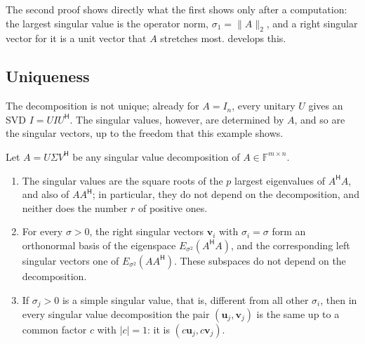 The second proof shows directly what the first shows only after a computation: the largest singular value is the operator norm, $\sigma_1=\|A\|_2$, and a right singular vector for it is a unit vector that $A$ stretches most.  develops this.

\subsection{Uniqueness}

The decomposition is not unique; already for $A=I_n$, every unitary $U$ gives an SVD $I=UIU^{\mathsf H}$. The singular values, however, are determined by $A$, and so are the singular vectors, up to the freedom that this example shows.

\begin{proposition}[Uniqueness]
\label{prop:svd-unique}
Let $A=U\Sigma V^{\mathsf H}$ be any singular value decomposition of $A\in\mathbb F^{m\times n}$.
\begin{enumerate}
\item The singular values are the square roots of the $p$ largest eigenvalues of $A^{\mathsf H}A$, and also of $AA^{\mathsf H}$; in particular, they do not depend on the decomposition, and neither does the number $r$ of positive ones.
\item For every $\sigma>0$, the right singular vectors $\mathbf v_i$ with $\sigma_i=\sigma$ form an orthonormal basis of the eigenspace $E_{\sigma^2}(A^{\mathsf H}A)$, and the corresponding left singular vectors one of $E_{\sigma^2}(AA^{\mathsf H})$. These subspaces do not depend on the decomposition.
\item If $\sigma_j>0$ is a simple singular value, that is, different from all other $\sigma_i$, then in every singular value decomposition the pair $(\mathbf u_j,\mathbf v_j)$ is the same up to a common factor $c$ with $|c|=1$: it is $(c\mathbf u_j,c\mathbf v_j)$.
\end{enumerate}
\end{proposition}

